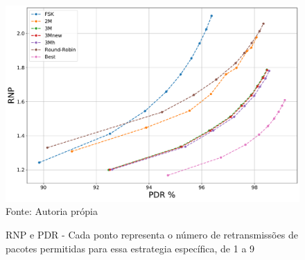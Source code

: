 \begin{figure}[H]
    \centering
    \caption{\footnotesize RNP e PDR - Cada ponto representa o número de retransmissões de pacotes permitidas para essa estrategia específica, de 1 a 9}
    \includegraphics[scale = 0.5]{sections/textual/Imagens/pdrvsrnp.pdf}\\
    Fonte: Autoria própia
    \label{fig:pdrvsrnp}
\end{figure}



